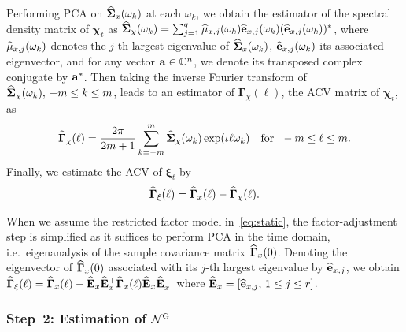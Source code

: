 Performing PCA on $\widehat{\bm\Sigma}_x(\omega_k)$ at each $\omega_k$, 
we obtain the estimator of the spectral density matrix of $\bm\chi_t$ as $\widehat{\bm\Sigma}_\chi(\omega_k) = \sum_{j = 1}^q \widehat{\mu}_{x, j}(\omega_k) \widehat{\mathbf e}_{x, j}(\omega_k) (\widehat{\mathbf e}_{x, j}(\omega_k))^*$, where $\widehat{\mu}_{x, j}(\omega_k)$ denotes the $j$-th largest eigenvalue of $\widehat{\bm\Sigma}_x(\omega_k)$, $\widehat{\mathbf e}_{x, j}(\omega_k)$ its associated eigenvector,
and for any vector $\mathbf a \in \mathbb{C}^n$, we denote its transposed complex conjugate by $\mathbf a^*$. 
Then taking the inverse Fourier transform of $\widehat{\bm\Sigma}_\chi(\omega_k), \, -m \le k \le m$, leads to an estimator of $\bm\Gamma_\chi(\ell)$, the ACV matrix of $\bm\chi_t$, as
\begin{align*}
\widehat{\bm\Gamma}_\chi(\ell) = \frac{2\pi}{2m + 1} \sum_{k = -m}^m
\widehat{\bm\Sigma}_\chi(\omega_k) \exp(\iota \ell \omega_k) \quad \text{for \ } -m \le \ell \le m.
\end{align*}
Finally, we estimate the ACV of $\bm\xi_t$ by
\begin{align}
\label{eq:acv:xi}
\widehat{\bm\Gamma}_\xi(\ell) = \widehat{\bm\Gamma}_x(\ell) - \widehat{\bm\Gamma}_\chi(\ell).
\end{align}

When we assume the restricted factor model in~\eqref{eq:static}, the factor-adjustment step is simplified as it suffices to perform PCA in the time domain, i.e.\ eigenanalysis of the sample covariance matrix $\widehat{\bm\Gamma}_x(0)$. Denoting the eigenvector of $\widehat{\bm\Gamma}_x(0)$ associated with its $j$-th largest eigenvalue by $\widehat{\mathbf e}_{x, j}$, we obtain $\widehat{\bm\Gamma}_\xi(\ell) = \widehat{\bm\Gamma}_x(\ell) - \widehat{\mathbf E}_x \widehat{\mathbf E}_x^\top \widehat{\bm\Gamma}_x(\ell) \widehat{\mathbf E}_x \widehat{\mathbf E}_x^\top$ where $\widehat{\mathbf E}_x = [\widehat{\mathbf e}_{x, j}, \, 1 \le j \le r]$.

\subsubsection{Step~2: Estimation of $\mathcal N^{\text{\upshape{G}}}$}
\label{sec:step:two}

